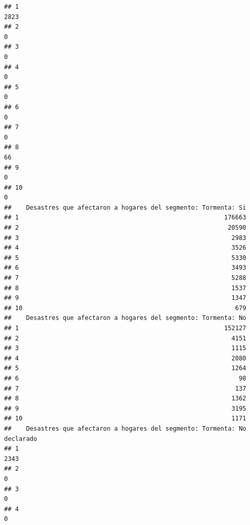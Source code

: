 \documentclass[11pt,]{article}
\begin{document}
\begin{verbatim}
## 1                                                                   2823
## 2                                                                      0
## 3                                                                      0
## 4                                                                      0
## 5                                                                      0
## 6                                                                      0
## 7                                                                      0
## 8                                                                     66
## 9                                                                      0
## 10                                                                     0
##    Desastres que afectaron a hogares del segmento: Tormenta: Si
## 1                                                        176663
## 2                                                         20590
## 3                                                          2983
## 4                                                          3526
## 5                                                          5330
## 6                                                          3493
## 7                                                          5288
## 8                                                          1537
## 9                                                          1347
## 10                                                          679
##    Desastres que afectaron a hogares del segmento: Tormenta: No
## 1                                                        152127
## 2                                                          4151
## 3                                                          1115
## 4                                                          2080
## 5                                                          1264
## 6                                                            98
## 7                                                           137
## 8                                                          1362
## 9                                                          3195
## 10                                                         1171
##    Desastres que afectaron a hogares del segmento: Tormenta: No declarado
## 1                                                                    2343
## 2                                                                       0
## 3                                                                       0
## 4                                                                       0

\end{verbatim}
\end{document}
